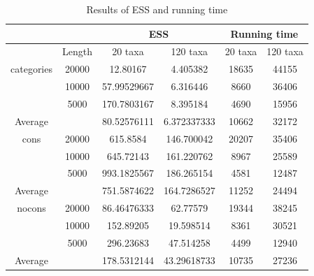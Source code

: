 \documentclass{bmcart}
\begin{document}
\begin{backmatter}
\begin{table}[h!]
  \centering
\begin{tabular}{cc|cc|cc}
\hline
&&\multicolumn{2}{c|}{ESS}&\multicolumn{2}{c}{Running time}\\
\hline
&Length&20 taxa&120 taxa&20 taxa&120 taxa\\
categories&20000&12.80167&4.405382&18635&44155\\
&10000&57.99529667&6.316446&8660&36406\\
&5000&170.7803167&8.395184&4690&15956\\
Average&&80.52576111&6.372337333&10662&32172\\
\hline
cons&20000&615.8584&146.700042&20207&35406\\
&10000&645.72143&161.220762&8967&25589\\
&5000&993.1825567&186.265154&4581&12487\\
Average&&751.5874622&164.7286527&11252&24494\\
\hline
nocons&20000&86.46476333&62.77579&19344&38245\\
&10000&152.89205&19.598514&8361&30521\\
&5000&296.23683&47.514258&4499&12940\\
Average&&178.5312144&43.29618733&10735&27236\\
\hline
\end{tabular}
\caption{Results of ESS and running time}\label{eff_comp1}
\end{table}

%


\end{backmatter}
\end{document}
